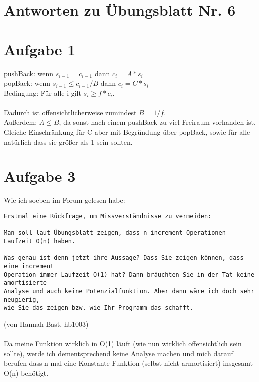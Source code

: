 \documentclass{scrartcl}
\begin{document}
\section*{Antworten zu Übungsblatt Nr. 6}

\section*{Aufgabe 1}

pushBack: wenn $s_{i-1} = c_{i-1}$ dann $c_i = A * s_i$ \\
popBack: wenn $s_{i-1} \leq c_{i-1} / B$ dann $c_i = C * s_i$ \\
Bedingung: Für alle i gilt $s_i \geq f * c_i$. \\ \\
Dadurch ist offensichtlicherweise zumindest $B = 1/f$. \\
Außerdem: $A \leq B$, da sonst nach einem pushBack zu viel Freiraum vorhanden ist. \\
Gleiche Einschränkung für C aber mit Begründung über popBack, sowie für alle
natürlich dass sie größer als 1 sein sollten.


\section*{Aufgabe 3}
Wie ich soeben im Forum gelesen habe:
\begin{verbatim}
Erstmal eine Rückfrage, um Missverständnisse zu vermeiden:

Man soll laut Übungsblatt zeigen, dass n increment Operationen Laufzeit O(n) haben.

Was genau ist denn jetzt ihre Aussage? Dass Sie zeigen können, dass eine increment
Operation immer Laufzeit O(1) hat? Dann bräuchten Sie in der Tat keine amortisierte
Analyse und auch keine Potenzialfunktion. Aber dann wäre ich doch sehr neugierig,
wie Sie das zeigen bzw. wie Ihr Programm das schafft.

\end{verbatim}
(von Hannah Bast, hb1003) \\ \\

Da meine Funktion wirklich in O(1) läuft (wie nun wirklich offensichtlich sein sollte),
werde ich dementsprechend keine Analyse machen und mich darauf berufen dass
n mal eine Konstante Funktion (selbst nicht-armortisiert) insgesamt O(n) benötigt.
\end{document}
